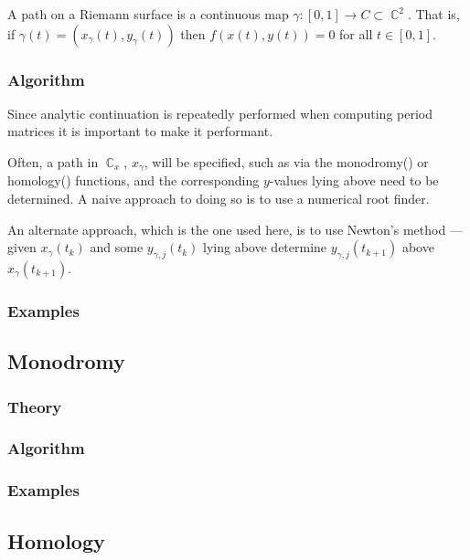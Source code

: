 \documentclass[10pt,twoside]{article}
\theoremstyle{plain}
\theoremstyle{definition}
\numberwithin{equation}{section}
\DeclareMathOperator{\CC}{\mathbb{C}}
\begin{document}
A path on a Riemann surface is a continuous map $\gamma : [0,1] \to C
\subset \CC^2$. That is, if $\gamma(t) = (x_\gamma(t), y_\gamma(t))$
then $f(x(t),y(t)) = 0$ for all $t \in [0,1]$.


%
\subsubsection*{Algorithm}
%

Since analytic continuation is repeatedly performed when computing
period matrices it is important to make it performant.

Often, a path in $\CC_x$, $x_\gamma$, will be specified, such as via the
{\sc monodromy() or homology()} functions, and the corresponding
$y$-values lying above need to be determined. A naive approach to doing
so is to use a numerical root finder.

An alternate approach, which is the one used here, is to use Newton's
method --- given $x_\gamma(t_k)$ and some $y_{\gamma,j}(t_k)$ lying
above determine $y_{\gamma,j}(t_{k+1})$ above $x_\gamma(t_{k+1})$.

%
\subsubsection*{Examples}
%

\subsection{Monodromy}

%
\subsubsection*{Theory}
%
%
\subsubsection*{Algorithm}
%
%
\subsubsection*{Examples}
%

\subsection{Homology}
\end{document}

